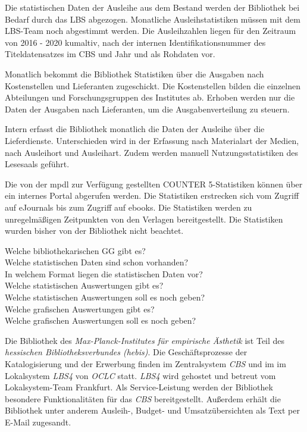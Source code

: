 Die statistischen Daten der Ausleihe aus dem Bestand werden der Bibliothek bei Bedarf durch das LBS abgezogen. 
Monatliche Ausleihstatistiken müssen mit dem LBS-Team noch abgestimmt werden. Die Ausleihzahlen liegen für 
den Zeitraum von 2016 - 2020 kumaltiv, nach der internen  Identifikationsnummer des Titeldatensatzes im 
\acrshort{CBS} und Jahr und als Rohdaten vor.

Monatlich bekommt die Bibliothek Statistiken über die Ausgaben nach Kostenstellen und Lieferanten zugeschickt. 
Die Kostenstellen bilden die einzelnen Abteilungen und Forschungsgruppen des Institutes ab. 
Erhoben werden nur die Daten der Ausgaben nach Lieferanten, um die Ausgabenverteilung zu steuern. 

Intern erfasst die Bibliothek monatlich die Daten der Ausleihe über die Lieferdienste. Unterschieden 
wird in der Erfassung nach Materialart der Medien, nach Ausleihort und Ausleihart. Zudem werden manuell Nutzungsstatistiken
des Lesesaals geführt.

Die von der \acrshort{mpdl} zur Verfügung gestellten COUNTER 5-Statistiken können über ein internes 
Portal abgerufen werden. Die Statistiken erstrecken sich vom Zugriff auf eJournals bis zum Zugriff auf ebooks.
Die Statistiken werden zu unregelmäßigen Zeitpunkten von den Verlagen bereitgestellt. 
Die Statistiken wurden bisher von der Bibliothek nicht beachtet.





\clearpage
Welche bibliothekarischen GG gibt es?\\
Welche statistischen Daten sind schon vorhanden?\\
In welchem Format liegen die statistischen Daten vor?\\
Welche statistischen Auswertungen gibt es?\\
Welche statistischen Auswertungen soll es noch geben?\\
Welche grafischen Auswertungen gibt es?\\
Welche grafischen Auswertungen soll es noch geben?



Die Bibliothek des \textit{Max-Planck-Institutes für empirische Ästhetik}
ist Teil des \textit{hessischen Bibliotheksverbundes (hebis)}. Die Geschäftsprozesse
der Katalogisierung und der Erwerbung finden im Zentralsystem \textit{CBS} und im im Lokalsystem \textit{LBS4} von
\textit{OCLC} statt. \textit{LBS4} wird gehostet und betreut vom Lokalsystem-Team Frankfurt. Als Service-Leistung werden der Bibliothek besondere Funktionalitäten
für das \textit{CBS} bereitgestellt. Außerdem erhält die Bibliothek unter anderem Ausleih-, Budget- und
Umsatzübersichten als Text per E-Mail zugesandt.


